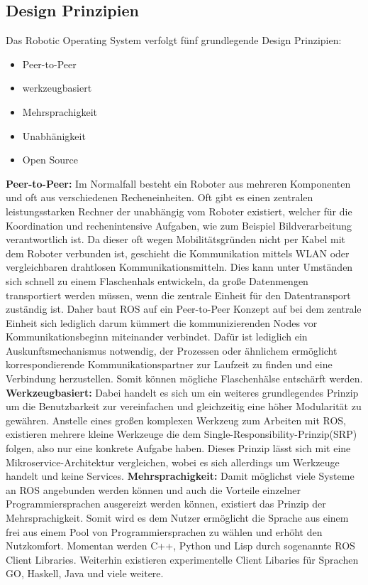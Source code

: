 \subsection{Design Prinzipien}
Das Robotic Operating System verfolgt fünf grundlegende Design Prinzipien: 
\begin{itemize}
	\item Peer-to-Peer
	\item werkzeugbasiert
	\item Mehrsprachigkeit
	\item Unabhänigkeit
	\item Open Source
\end{itemize}
\textbf{Peer-to-Peer:} Im Normalfall besteht ein Roboter aus mehreren Komponenten und oft aus verschiedenen Recheneinheiten. Oft gibt es einen zentralen leistungsstarken Rechner der unabhängig vom Roboter existiert, welcher für die Koordination und rechenintensive Aufgaben, wie zum Beispiel Bildverarbeitung verantwortlich ist. Da dieser oft wegen Mobilitätsgründen nicht per Kabel mit dem Roboter verbunden ist, geschieht die Kommunikation mittels WLAN oder vergleichbaren drahtlosen Kommunikationsmitteln. Dies kann unter Umständen sich schnell zu einem Flaschenhals entwickeln, da große Datenmengen transportiert werden müssen, wenn die zentrale Einheit für den Datentransport zuständig ist. Daher baut ROS auf ein Peer-to-Peer Konzept auf bei dem zentrale Einheit sich lediglich darum kümmert die kommunizierenden Nodes vor Kommunikationsbeginn miteinander verbindet. Dafür ist lediglich ein Auskunftsmechanismus notwendig, der Prozessen oder ähnlichem ermöglicht korrespondierende Kommunikationspartner zur Laufzeit zu finden und eine Verbindung herzustellen. Somit können mögliche Flaschenhälse entschärft werden.\cite{rosbook}\cite{rosconcepts}\cite{rosprinc}\newline 
\textbf{Werkzeugbasiert:} Dabei handelt es sich um ein weiteres grundlegendes Prinzip um die Benutzbarkeit zur vereinfachen und gleichzeitig eine höher Modularität zu gewähren. Anstelle eines großen komplexen Werkzeug zum Arbeiten mit ROS, existieren mehrere kleine Werkzeuge die dem Single-Responsibility-Prinzip(SRP)\cite{singleresp} folgen, also nur eine konkrete Aufgabe haben. Dieses Prinzip lässt sich mit eine Mikroservice-Architektur vergleichen, wobei es sich allerdings um Werkzeuge handelt und keine Services.
\newline
\textbf{Mehrsprachigkeit:} Damit möglichst viele Systeme an ROS angebunden werden können und auch die Vorteile einzelner Programmiersprachen ausgereizt werden können, existiert das Prinzip der Mehrsprachigkeit. Somit wird es dem Nutzer ermöglicht die Sprache aus einem frei aus einem Pool von Programmiersprachen zu wählen und erhöht den Nutzkomfort. Momentan werden C++, Python und Lisp durch sogenannte ROS Client Libraries. Weiterhin existieren experimentelle Client Libaries für Sprachen GO, Haskell, Java und viele weitere.\cite{clientlibary}
